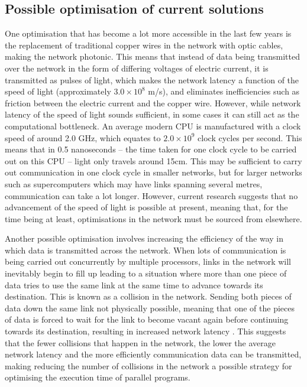 \documentclass[a4paper, 12pt]{article}
\begin{document}
\subsection{Possible optimisation of current solutions}
\label{sec:possible_optimisations}

One optimisation that has become a lot more accessible in the last few years is the replacement of traditional copper wires in the network with optic cables, making the network photonic. This means that instead of data being transmitted over the network in the form of differing voltages of electric current, it is transmitted as pulses of light, which makes the network latency a function of the speed of light (approximately $3.0 \times 10^8 $ m/s), and eliminates inefficiencies such as friction between the electric current and the copper wire. However, while network latency of the speed of light sounds sufficient, in some cases it can still act as the computational bottleneck. An average modern CPU is manufactured with a clock speed of around 2.0 GHz, which equates to $2.0 \times 10^9$ clock cycles per second. This means that in 0.5 nanoseconds -- the time taken for one clock cycle to be carried out on this CPU -- light only travels around 15cm. This may be sufficient to carry out communication in one clock cycle in smaller networks, but for larger networks such as supercomputers which may have links spanning several metres, communication can take a lot longer. However, current research suggests that no advancement of the speed of light is possible at present, meaning that, for the time being at least, optimisations in the network must be sourced from elsewhere. 

Another possible optimisation involves increasing the efficiency of the way in which data is transmitted across the network. When lots of communication is being carried out concurrently by multiple processors, links in the network will inevitably begin to fill up leading to a situation where more than one piece of data tries to use the same link at the same time to advance towards its destination. This is known as a collision in the network. Sending both pieces of data down the same link not physically possible, meaning that one of the pieces of data is forced to wait for the link to become vacant again before continuing towards its destination, resulting in increased network latency \cite{Lam04}. This suggests that the fewer collisions that happen in the network, the lower the average network latency and the more efficiently communication data can be transmitted, making reducing the number of collisions in the network a possible strategy for optimising the execution time of parallel programs.
\end{document}
